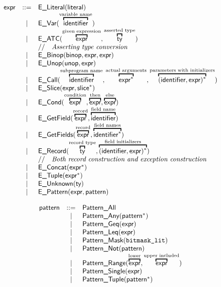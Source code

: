 \documentclass{book}
\begin{document}
\[
\begin{array}{rcl}
\expr &::=& \ELiteral(\literal) \\
	&|& \EVar(\overtext{\identifier}{variable name}) \\
	&|& \EATC(\overtext{\expr}{given expression}, \overtext{\ty}{asserted type}) \\
  & & \ASTComment{Asserting type conversion}\\
	&|& \EBinop(\binop, \expr, \expr) \\
	&|& \EUnop(\unop, \expr) \\
	&|& \ECall(\overtext{\identifier}{subprogram name}, \overtext{\expr^{*}}{actual arguments}, \overtext{(\identifier, \expr)^{*}}{parameters with initializers}) \\
	&|& \ESlice(\expr, \slice^{*}) \\
	&|& \ECond(\overtext{\expr}{condition}, \overtext{\expr}{then}, \overtext{\expr}{else}) \\
	&|& \EGetField(\overtext{\expr}{record}, \overtext{\identifier}{field name}) \\
	&|& \EGetFields(\overtext{\expr}{record}, \overtext{\identifier^{*}}{field names}) \\
	&|& \ERecord(\overtext{\ty}{record type}, \overtext{(\identifier, \expr)^{*}}{field initializers})\\
    & & \ASTComment{Both record construction and exception construction}\\
	&|& \EConcat(\expr^{*}) \\
	&|& \ETuple(\expr^{*}) \\
	&|& \EUnknown(\ty) \\
	&|& \EPattern(\expr, \pattern)
\end{array}
\]

\[
\begin{array}{rcl}
\pattern &::=& \PatternAll \\
  &|& \PatternAny(\pattern^{*}) \\
  &|& \PatternGeq(\expr) \\
  &|& \PatternLeq(\expr) \\
  &|& \PatternMask(\texttt{bitmask\_lit}) \\
  &|& \PatternNot(\pattern) \\
  &|& \PatternRange(\overtext{\expr}{lower}, \overtext{\expr}{upper included})\\
  &|& \PatternSingle(\expr) \\
  &|& \PatternTuple(\pattern^{*}) \\
\end{array}
\]
\end{document}
